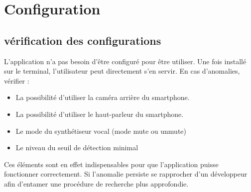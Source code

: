\documentclass[UTF8]{EPURapport}
\begin{document}
\chapter{Configuration}
\section{vérification des configurations}
L'application n'a pas besoin d'être configuré pour être utiliser. Une fois installé sur le terminal, l'utilisateur peut directement s'en servir. En cas d'anomalies, vérifier :
\begin{itemize}
  \item La possibilité d'utiliser la caméra arrière du smartphone.
  \item La possibilité d'utiliser le haut-parleur du smartphone.
  \item Le mode du synthétiseur vocal (mode mute ou unmute)
  \item Le niveau du seuil de détection minimal
\end{itemize}

Ces éléments sont en effet indispensables pour que l'application puisse fonctionner correctement. Si l'anomalie persiste se rapprocher d'un développeur afin d'entamer une procédure de recherche plus approfondie.
\end{document}
